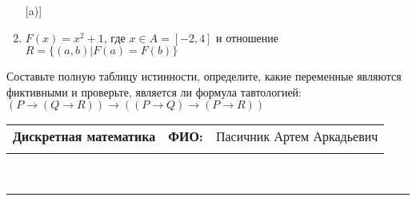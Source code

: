 \documentclass[10pt]{exam}
\newcommand{\class}{Дискретная математика}
\newcommand{\examdate}{}
\begin{document}
\begin{questions}
\begin{enumerate} [a)]
\item $F(x)=x^{2}+1$, где $x \in A = [-2, 4]$ и отношение $R = \{(a,b)|F(a) = F(b)\}$
\end{enumerate}\question Составьте полную таблицу истинности, определите, какие переменные являются фиктивными и проверьте, является ли формула тавтологией:
$(P \rightarrow (Q \rightarrow R)) \rightarrow ((P \rightarrow Q) \rightarrow (P \rightarrow R))$

\end{questions}
\newpage
\begin{flushright}
\begin{tabular}{p{2.8in} r l}
\textbf{\class} & \textbf{ФИО:} &Пасичник Артем Аркадьевич
\\

\textbf{\examdate} &&\\
\end{tabular}\\
\end{flushright}
\rule[1ex]{\textwidth}{.1pt}
\end{document}
